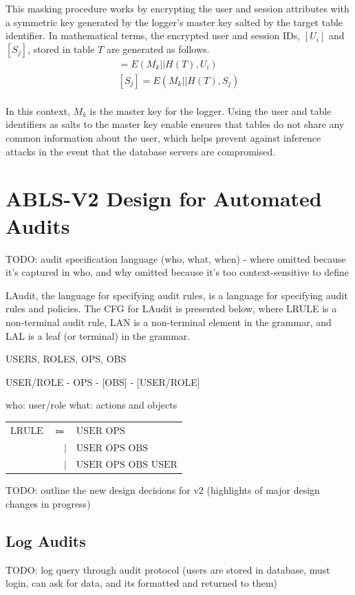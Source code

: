 \documentclass{sig-alternate}
\begin{document}
This masking procedure works by encrypting the user and session attributes with a symmetric key generated
by the logger's master key salted by the target table identifier. In mathematical
terms, the encrypted user and session IDs, $[U_i]$ and $[S_j]$, stored in table $T$ are generated as follows.
\begin{align*}
[U_i] = E(M_k || H(T), U_i) \\
[S_j] = E(M_k || H(T), S_j) \\
\end{align*}

In this context, $M_k$ is the master key for the logger. Using the user and table identifiers as salts to the master key 
enable ensures that tables do not share any common information about the user, which helps prevent against 
inference attacks in the event that the database servers are compromised.

\section{ABLS-V2 Design for Automated Audits}
TODO: audit specification language (who, what, when) - where omitted because it's captured in who, and why omitted because it's too context-sensitive to define

LAudit, the language for specifying audit rules, is a language for specifying audit rules and policies. The CFG for LAudit 
is presented below, where LRULE is a non-terminal audit rule, LAN is a non-terminal element in the grammar, and LAL 
is a leaf (or terminal) in the grammar.

USERS, ROLES, OPS, OBS

USER/ROLE - OPS - [OBS] - [USER/ROLE]

who: user/role
what: actions and objects

{\setlength\tabcolsep{4pt}
\begin{tabular}{>{$}l<{$}>{$}r<{$}>{$}l<{$}}
  \text{LRULE} &\Coloneqq & \text{USER OPS}\\
  &| & \text{USER OPS OBS} \\
  &| & \text{USER OPS OBS USER}
\end{tabular}}

TODO: outline the new design decisions for v2 (highlights of major design changes in progress)

\subsection{Log Audits}
\label{sec:audit}
TODO: log query through audit protocol (users are stored in database, must login, can ask for data, and its formatted and returned to them)
\end{document}
